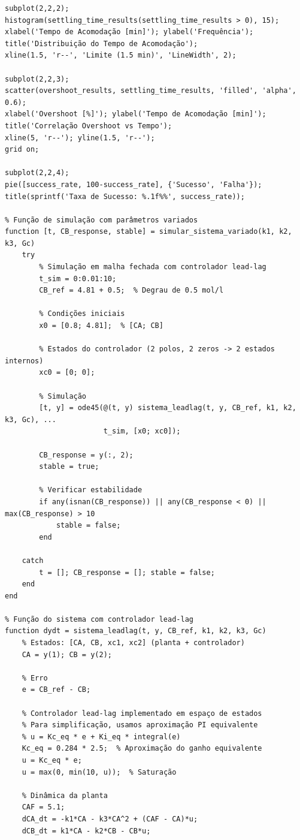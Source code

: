 \documentclass[a4paper,12pt]{article}
\begin{document}
\begin{lstlisting}[caption=Simulação de robustez - Controlador Lead-Lag]
subplot(2,2,2);
histogram(settling_time_results(settling_time_results > 0), 15);
xlabel('Tempo de Acomodação [min]'); ylabel('Frequência');
title('Distribuição do Tempo de Acomodação');
xline(1.5, 'r--', 'Limite (1.5 min)', 'LineWidth', 2);

subplot(2,2,3);
scatter(overshoot_results, settling_time_results, 'filled', 'alpha', 0.6);
xlabel('Overshoot [%]'); ylabel('Tempo de Acomodação [min]');
title('Correlação Overshoot vs Tempo');
xline(5, 'r--'); yline(1.5, 'r--');
grid on;

subplot(2,2,4);
pie([success_rate, 100-success_rate], {'Sucesso', 'Falha'});
title(sprintf('Taxa de Sucesso: %.1f%%', success_rate));

% Função de simulação com parâmetros variados
function [t, CB_response, stable] = simular_sistema_variado(k1, k2, k3, Gc)
    try
        % Simulação em malha fechada com controlador lead-lag
        t_sim = 0:0.01:10;
        CB_ref = 4.81 + 0.5;  % Degrau de 0.5 mol/l
        
        % Condições iniciais
        x0 = [0.8; 4.81];  % [CA; CB]
        
        % Estados do controlador (2 polos, 2 zeros -> 2 estados internos)
        xc0 = [0; 0];
        
        % Simulação
        [t, y] = ode45(@(t, y) sistema_leadlag(t, y, CB_ref, k1, k2, k3, Gc), ...
                       t_sim, [x0; xc0]);
        
        CB_response = y(:, 2);
        stable = true;
        
        % Verificar estabilidade
        if any(isnan(CB_response)) || any(CB_response < 0) || max(CB_response) > 10
            stable = false;
        end
        
    catch
        t = []; CB_response = []; stable = false;
    end
end

% Função do sistema com controlador lead-lag
function dydt = sistema_leadlag(t, y, CB_ref, k1, k2, k3, Gc)
    % Estados: [CA, CB, xc1, xc2] (planta + controlador)
    CA = y(1); CB = y(2);
    
    % Erro
    e = CB_ref - CB;
    
    % Controlador lead-lag implementado em espaço de estados
    % Para simplificação, usamos aproximação PI equivalente
    % u = Kc_eq * e + Ki_eq * integral(e)
    Kc_eq = 0.284 * 2.5;  % Aproximação do ganho equivalente
    u = Kc_eq * e;
    u = max(0, min(10, u));  % Saturação
    
    % Dinâmica da planta
    CAF = 5.1;
    dCA_dt = -k1*CA - k3*CA^2 + (CAF - CA)*u;
    dCB_dt = k1*CA - k2*CB - CB*u;
    

\end{lstlisting}
\end{document}

